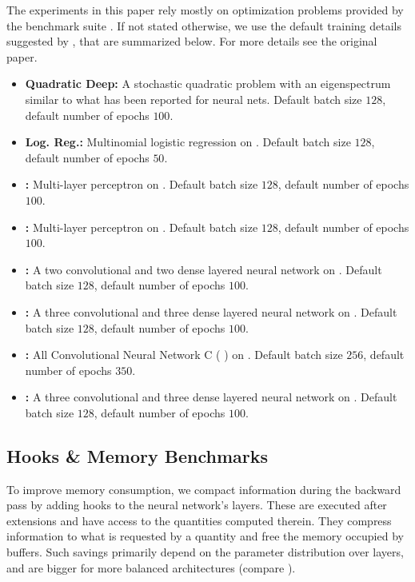 The experiments in this paper rely mostly on optimization problems provided by
the \deepobs benchmark suite \citep{schneider2019deepobs}. If not stated
otherwise, we use the default training details suggested by \deepobs, that are
summarized below. For more details see the original paper.
\begin{itemize}
\item \textbf{Quadratic Deep:} A stochastic quadratic problem with an
  eigenspectrum similar to what has been reported for neural nets. Default batch
  size $128$, default number of epochs $100$.
\item \textbf{\mnist Log. Reg.:} Multinomial logistic regression on \mnist
  \citep{lecun1998gradient}. Default batch size $128$, default number of epochs $50$.
\item \textbf{\mnist \mlp:} Multi-layer perceptron on \mnist.
  Default batch size $128$, default number of epochs $100$.
\item \textbf{\fmnist \mlp:} Multi-layer perceptron on \fmnist
  \citep{xiao2017fashion}. Default batch size $128$, default number of epochs $100$.
\item \textbf{\fmnist \twoctwod:} A two convolutional and two dense layered
  neural network on \fmnist. Default batch size $128$, default number of epochs
  $100$.
\item \textbf{\cifarten \threecthreed:} A three convolutional and three dense
  layered neural network on \cifarten \citep{krizhevsky2009learning}. Default batch size
  $128$, default number of epochs $100$.
\item \textbf{\cifarhun \allcnnc:} All Convolutional Neural Network C (\allcnnc
  \citep{springenberg2015striving}) on \cifarhun \citep{krizhevsky2009learning}. Default batch
  size $256$, default number of epochs $350$.
\item \textbf{\svhn \threecthreed:} A three convolutional and three dense
  layered neural network on \svhn \citep{netzer2011reading}. Default batch size $128$,
  default number of epochs $100$.
\end{itemize}

\subsection{Hooks \& Memory Benchmarks}\label{cockpit::app:hooks_benchmarks}

To improve memory consumption, we compact information during the backward pass
by adding hooks to the neural network's layers. These are executed after
\backpack extensions and have access to the quantities computed therein. They
compress information to what is requested by a quantity and free the memory
occupied by \backpack buffers. Such savings primarily depend on the parameter
distribution over layers, and are bigger for more balanced architectures
(compare ).


